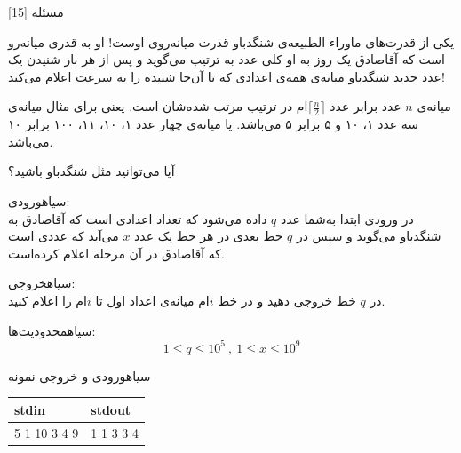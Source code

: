 ‌مسئله [15]

یکی از قدرت‌های ماوراء الطبیعه‌ی شنگدباو قدرت میانه‌روی اوست! او به قدری میانه‌رو است که آقاصادق یک روز به او کلی عدد به ترتیب می‌گوید و پس از هر بار شنیدن یک عدد جدید شنگدباو میانه‌‌ی همه‌ی اعدادی که تا آن‌جا شنیده را به سرعت اعلام می‌کند!

میانه‌ی $n$ عدد برابر عدد $\lceil \frac{n}{2} \rceil$ام در ترتیب مرتب شده‌شان است. یعنی برای مثال میانه‌ی سه عدد ۱، ۱۰ و ۵ برابر ۵ می‌باشد. یا میانه‌ی چهار عدد ۱، ۱۰، ۱۱، ۱۰۰ برابر ۱۰ می‌باشد. 

آیا می‌توانید مثل شنگدباو باشید؟


‌سیاه{ورودی:}\\
در ورودی ابتدا به‌شما عدد $q$ داده‌ می‌شود که تعداد اعدادی است که آقاصادق به شنگدباو می‌گوید و سپس در $q$ خط بعدی در هر خط یک عدد $x$ می‌آید که عددی است که آقاصادق در آن مرحله اعلام کرده‌است.


‌سیاه{خروجی:}\\
در $q$ خط خروجی دهید و در خط $i$ام میانه‌ی اعداد اول تا $i$ام را اعلام کنید.

‌سیاه{محدودیت‌ها:}
$$ 1 \le q \le 10^5 \ , \ 1 \le x \le 10^9$$

‌سیاه{ورودی و خروجی نمونه}\\
\begin{latin}
 \begin{tabularx}{\textwidth}{|X | X|}
 \hline
 \textbf{stdin} &
 \textbf{stdout}\\
 \hline
 5
 1
 10
 3
 4
 9&
 1
 1
 3
 3
 4\\
 \hline
 
 \end{tabularx}
\end{latin}

%
% 


